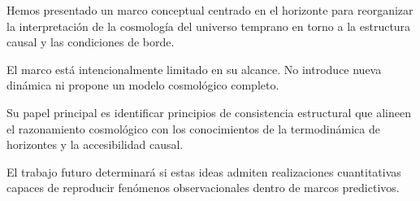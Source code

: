 \documentclass[12pt,a4paper]{article}
\begin{document}
Hemos presentado un marco conceptual centrado en el horizonte para reorganizar la interpretación de la cosmología del universo temprano en torno a la estructura causal y las condiciones de borde.

El marco está intencionalmente limitado en su alcance. No introduce nueva dinámica ni propone un modelo cosmológico completo.

Su papel principal es identificar principios de consistencia estructural que alineen el razonamiento cosmológico con los conocimientos de la termodinámica de horizontes y la accesibilidad causal.

El trabajo futuro determinará si estas ideas admiten realizaciones cuantitativas capaces de reproducir fenómenos observacionales dentro de marcos predictivos.
\end{document}
